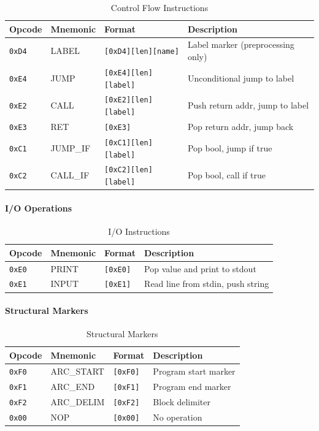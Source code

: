 \documentclass[11pt,a4paper]{article}
\begin{document}
\begin{table}[h]
\centering
\begin{tabular}{@{}llll@{}}
\toprule
Opcode & Mnemonic & Format & Description \\
\midrule
\texttt{0xD4} & LABEL & \texttt{[0xD4][len][name]} & Label marker (preprocessing only) \\
\texttt{0xE4} & JUMP & \texttt{[0xE4][len][label]} & Unconditional jump to label \\
\texttt{0xE2} & CALL & \texttt{[0xE2][len][label]} & Push return addr, jump to label \\
\texttt{0xE3} & RET & \texttt{[0xE3]} & Pop return addr, jump back \\
\texttt{0xC1} & JUMP\_IF & \texttt{[0xC1][len][label]} & Pop bool, jump if true \\
\texttt{0xC2} & CALL\_IF & \texttt{[0xC2][len][label]} & Pop bool, call if true \\
\bottomrule
\end{tabular}
\caption{Control Flow Instructions}
\end{table}

\paragraph{I/O Operations}

\begin{table}[h]
\centering
\begin{tabular}{@{}llll@{}}
\toprule
Opcode & Mnemonic & Format & Description \\
\midrule
\texttt{0xE0} & PRINT & \texttt{[0xE0]} & Pop value and print to stdout \\
\texttt{0xE1} & INPUT & \texttt{[0xE1]} & Read line from stdin, push string \\
\bottomrule
\end{tabular}
\caption{I/O Instructions}
\end{table}

\paragraph{Structural Markers}

\begin{table}[h]
\centering
\begin{tabular}{@{}llll@{}}
\toprule
Opcode & Mnemonic & Format & Description \\
\midrule
\texttt{0xF0} & ARC\_START & \texttt{[0xF0]} & Program start marker \\
\texttt{0xF1} & ARC\_END & \texttt{[0xF1]} & Program end marker \\
\texttt{0xF2} & ARC\_DELIM & \texttt{[0xF2]} & Block delimiter \\
\texttt{0x00} & NOP & \texttt{[0x00]} & No operation \\
\bottomrule
\end{tabular}
\caption{Structural Markers}
\end{table}
\end{document}
